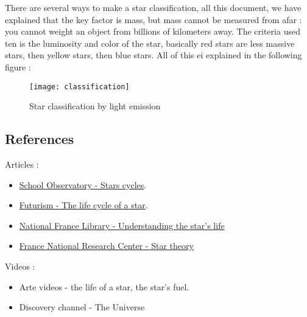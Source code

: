 \documentclass[a4paper, 11pt]{article} %
\begin{document}
There are several ways to make a star classification, all this document, we have explained that the key factor is mass, but mass cannot be measured from afar : you cannot weight an object from billions of kilometers away. The criteria used ten is the luminosity and color of the star, basically red stars are less massive stars, then yellow stars, then blue stars. All of this ei explained in the following figure	 :

\begin{figure}[h]
\centering
\texttt{[image: classification]}
\caption{Star classification by light emission}
\end{figure}

\newpage

\subsection*{References}
Articles :
\begin{itemize}
\item \href{http://www.schoolsobservatory.org.uk/learn/astro/stars/cycle}{School Observatory - Stars cycles}.
\item \href{https://futurism.com/the-life-cycle-of-a-star/}{Futurism - The life cycle of a star}.
\item \href{http://expositions.bnf.fr/ciel/elf/page12.htm}{National France Library - Understanding the star's life}
\item \href{http://www.cnrs.fr/cw/dossiers/dosbig/decouv/xchrono/etoiles/niv1_1.htm}{France National Research Center - Star theory}
\end{itemize}

Videos :
\begin{itemize}
\item Arte videos - the life of a star, the star's fuel.
\item Discovery channel - The Universe
\end{itemize}

%

%

\end{document}
